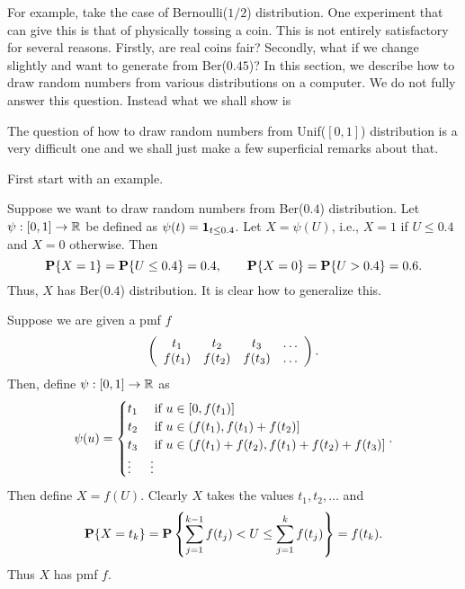 \documentclass[preprint,  11pt]{amsart}
\begin{document}
For example, take the case of Bernoulli($1/2$) distribution. One experiment that can give this is that of physically tossing a coin. This is not entirely satisfactory for several reasons. Firstly, are real coins fair? Secondly, what if we change slightly and want to generate from Ber($0.45$)? In this section, we describe how to draw random numbers from various distributions on a computer. We do not fully answer this question. Instead what we shall show is




The question of how to draw random numbers from Unif($[0,1]$) distribution is a very difficult one and we shall just make a few superficial remarks about that. 

 First start with an example.

\beg Suppose we want to draw random numbers from Ber($0.4$) distribution. Let $\psi:[0,1]\to \R$ be defined as $\psi(t)=\one_{t\le 0.4}$. Let $X=\psi(U)$, i.e., $X=1$ if $U\le 0.4$ and $X=0$ otherwise. Then
$$
\P\{X=1\}=\P\{U\le 0.4\}=0.4, \qquad \P\{X=0\} = \P\{U>0.4\}=0.6.
$$
Thus, $X$ has Ber($0.4$) distribution. 
\eeg
It is clear how to generalize this. 

 Suppose we are given a pmf $f$
$$
\l(\begin{array}{cccc} t_{1} & t_{2} & t_{3} & \ldots \\ f(t_{1}) & f(t_{2}) & f(t_{3}) & \ldots \end{array} \r).
$$
Then, define $\psi:[0,1]\to \R$ as
$$
\psi(u) = \begin{cases} t_{1} & \mb{ if }u\in [0,f(t_{1})] \\
t_{2} & \mb{ if }u\in (f(t_{1}),f(t_{1})+f(t_{2})] \\
t_{3} & \mb{ if }u\in (f(t_{1})+f(t_{2}),f(t_{1})+f(t_{2})+f(t_{3})] \\
\vdots & \vdots \end{cases}.
$$
Then define $X=f(U)$. Clearly $X$ takes the values $t_{1},t_{2},\ldots$ and 
$$
\P\{X=t_{k}\} = \P\l\{\sum_{j=1}^{k-1}f(t_{j})<U\le \sum_{j=1}^{k}f(t_{j})\r\} = f(t_{k}).
$$
Thus $X$ has pmf $f$.
\end{document}
